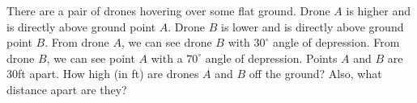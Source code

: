 There are a pair of drones hovering over some flat ground. Drone $A$ is higher and is directly above ground point $A$. Drone $B$ is lower and is directly above ground point $B$. From drone $A$, we can see drone $B$ with $30^{\circ}$ angle of depression. From drone $B$, we can see point $A$ with a $70^{\circ}$ angle of depression. Points $A$ and $B$ are $30$ft apart. How high (in ft) are drones $A$ and $B$ off the ground? Also, what distance apart are they?
